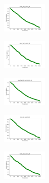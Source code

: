 \begin{figure}[H]
\begin{subfigure}
    \end{subfigure}
    \hfill
    \begin{subfigure}
        \centering
        \includegraphics[width=0.234\textwidth]{img/agesf/ecoli_set_const_20_589741062_cost.png}
    \end{subfigure}
    \hfill
    \begin{subfigure}
        \centering
        \includegraphics[width=0.234\textwidth]{img/agesf/rand_set_const_20_589741062_cost.png}
    \end{subfigure}
    \hfill
    \begin{subfigure}
        \centering
        \includegraphics[width=0.234\textwidth]{img/agesf/newthyroid_set_const_20_589741062_cost.png}
    \end{subfigure}
    \hfill
    \begin{subfigure}
        \centering
        \includegraphics[width=0.234\textwidth]{img/agesf/iris_set_const_20_277451237_cost.png}
    \end{subfigure}
    \hfill
    \begin{subfigure}
        \centering
        \includegraphics[width=0.234\textwidth]{img/agesf/ecoli_set_const_20_277451237_cost.png}
    \end{subfigure}
    \hfill

\end{figure}

